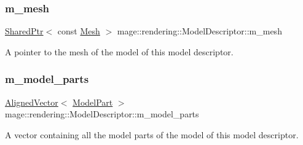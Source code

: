 \subsubsection{\texorpdfstring{m\+\_\+mesh}{m\_mesh}}
{\footnotesize\ttfamily \hyperlink{namespacemage_a1e01ae66713838a7a67d30e44c67703e}{Shared\+Ptr}$<$ const \hyperlink{classmage_1_1rendering_1_1_mesh}{Mesh} $>$ mage\+::rendering\+::\+Model\+Descriptor\+::m\+\_\+mesh\hspace{0.3cm}{\ttfamily [private]}}

A pointer to the mesh of the model of this model descriptor. \hypertarget{classmage_1_1rendering_1_1_model_descriptor_a2c2eda62e6f2c7f6274a0f829b6abfa1}{}\label{classmage_1_1rendering_1_1_model_descriptor_a2c2eda62e6f2c7f6274a0f829b6abfa1} 
\subsubsection{\texorpdfstring{m\+\_\+model\+\_\+parts}{m\_model\_parts}}
{\footnotesize\ttfamily \hyperlink{namespacemage_a8664bfb5ce2179fc64eae9f82c8a5ba8}{Aligned\+Vector}$<$ \hyperlink{structmage_1_1rendering_1_1_model_part}{Model\+Part} $>$ mage\+::rendering\+::\+Model\+Descriptor\+::m\+\_\+model\+\_\+parts\hspace{0.3cm}{\ttfamily [private]}}

A vector containing all the model parts of the model of this model descriptor. 